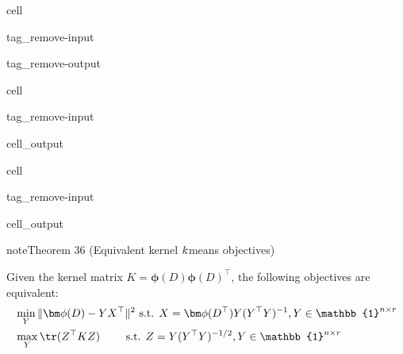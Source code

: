 \documentclass[letterpaper,10pt,english]{jupyterBook}
\begin{document}
\begin{sphinxuseclass}{cell}
\begin{sphinxuseclass}{tag_remove-input}
\begin{sphinxuseclass}{tag_remove-output}
\end{sphinxuseclass}
\end{sphinxuseclass}
\end{sphinxuseclass}
\begin{sphinxuseclass}{cell}
\begin{sphinxuseclass}{tag_remove-input}\begin{sphinxVerbatimOutput}

\begin{sphinxuseclass}{cell_output}
\noindent{}

\end{sphinxuseclass}\end{sphinxVerbatimOutput}

\end{sphinxuseclass}
\end{sphinxuseclass}
\begin{sphinxuseclass}{cell}
\begin{sphinxuseclass}{tag_remove-input}\begin{sphinxVerbatimOutput}

\begin{sphinxuseclass}{cell_output}
\noindent{}

\end{sphinxuseclass}\end{sphinxVerbatimOutput}

\end{sphinxuseclass}
\end{sphinxuseclass}\label{clustering_kernel_kmeans:theorem-1}
\begin{sphinxadmonition}{note}{Theorem 36 (Equivalent kernel \protect\(k\protect\)\sphinxhyphen{}means objectives)}



\sphinxAtStartPar
Given the kernel matrix \(K={\bm\phi}(D){\bm\phi}(D)^\top\),
the following objectives are equivalent:
\label{equation:clustering_kernel_kmeans:842cef98-ba22-4ca1-9900-8920455cf0ae}\begin{align}
&\min_{Y} \|{\bm\phi}(D)-YX^\top\|^2 \text{  s.t. } X= {\bm\phi}(D^\top) Y(Y^\top Y)^{-1}, Y\in\mathbb{1}^{n\times r} \label{eq:kernelKMPhi1}\\
&\max_{Y} \tr(Z^\top K Z)\qquad\text{ s.t. } Z= Y(Y^\top Y)^{-1/2}, Y\in\mathbb{1}^{n\times r} \label{eq:kernelKMtr}
\end{align}\end{sphinxadmonition}
\end{document}
